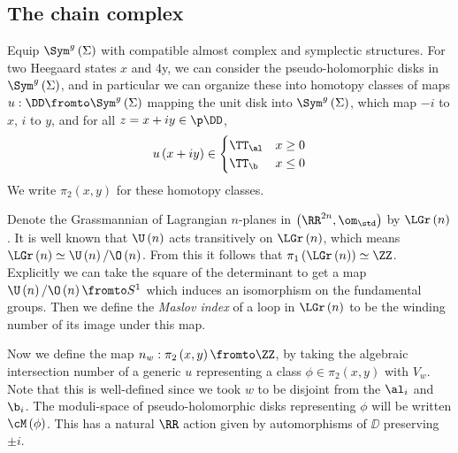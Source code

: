 \documentclass{amsproc}
\begin{document}
\subsection{The chain complex}

Equip $\Sym^g\left( \Sigma \right)$ with compatible almost complex
and symplectic structures.
For two Heegaard states $x$ and 4y, we can consider the pseudo-holomorphic
disks in $\Sym^g\left( \Sigma \right)$, and in particular we can organize these into
homotopy classes of maps $u:\DD\fromto \Sym^g\left( \Sigma \right)$ mapping the unit
disk into $\Sym^g\left( \Sigma \right)$, which map $-i$ to $x$, $i$ to $y$,
and for all $z = x + iy \in \p \DD$,
\begin{equation}
u\left( x+ iy \right) \in
\begin{cases}
\TT_\al & x \geq 0 \\
\TT_\b & x\leq 0
\end{cases}
\end{equation}
We write $\pi_2\left( x , y \right)$ for these homotopy classes.

Denote the Grassmannian of Lagrangian $n$-planes in
$\left( \RR^{2n} , \om_\std \right)$ by $\LGr\left( n \right)$.
It is well known that $\U\left( n \right)$ acts transitively on $\LGr\left( n \right)$, 
which means $\LGr\left( n \right) \simeq \U\left( n \right) / \O\left( n \right)$.
From this it follows that $\pi_1\left( \LGr\left( n \right) \right) \simeq \ZZ$.
Explicitly we can take the square of the determinant to get
a map $\U\left( n \right) / \O\left( n \right) \fromto S^1$
which induces an isomorphism on the fundamental groups.
Then we define the \emph{Maslov index} of a loop in $\LGr\left( n \right)$ to
be the winding number of its image under this map.

Now we define the map $n_w : \pi_2\left( x , y \right) \fromto \ZZ$, 
by taking the algebraic intersection number of a generic
$u$ representing a class $\phi \in \pi_2\left( x , y \right)$ with $V_w$. 
Note that this is well-defined since we took $w$ to be disjoint 
from the $\al_i$ and $\b_i$. 
The moduli-space of pseudo-holomorphic disks representing $\phi$ will be written
$\cM\left( \phi \right)$. 
This has a natural $\RR$ action given by automorphisms of $\DD$ preserving $\pm i$.
\end{document}
